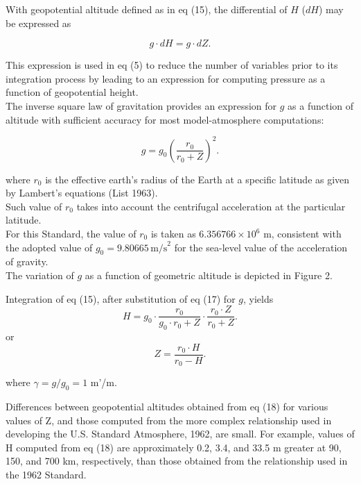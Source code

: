 \documentclass{article}
\begin{document}
With geopotential altitude defined as in eq (15), the differential of $H$ ($dH$) may be expressed as

\begin{equation}
 g\cdot dH = g\cdot dZ. \tag{16}
\end{equation}

This expression is used in eq (5) to reduce the number of variables prior to its integration process by leading to an expression for computing pressure as a function of geopotential height. \\

The inverse square law of gravitation provides an expression for $g$ as a function of altitude with sufficient accuracy for most model-atmosphere computations:

\begin{equation}
 g = g_0 \left( \frac{r_0}{r_0 + Z} \right)^2. \tag{17}
\end{equation}

where $r_0$ is the effective earth's radius of the Earth at a specific latitude as given by Lambert's equations (List 1963). \\
Such value of $r_0$ takes into account the centrifugal acceleration at the particular latitude. \\
For this Standard, the value of $r_0$ is taken as $6.356766 \times 10^6$ m, consistent with the adopted value of $g_0 = 9.80665 \, \text{m/s}^2$ for the sea-level value of the acceleration of gravity. \\
The variation of $g$ as a function of geometric altitude is depicted in Figure 2.


Integration of eq (15), after substitution of eq (17) for $g$, yields
\begin{equation}
 H = g_0 \cdot \frac{r_0}{g_0 \cdot r_0 + Z} \cdot \frac{r_0 \cdot Z}{r_0 + Z}. \tag{18}
\end{equation}
or
\begin{equation}
 Z = \frac{r_0 \cdot H}{r_0 - H}. \tag{19}
\end{equation}

where $\gamma = g/g_0 = 1$ m'/m.

Differences between geopotential altitudes obtained from eq (18) for various values of Z, and those computed from the more complex relationship used in developing the U.S. Standard Atmosphere, 1962, are small. For example, values of H computed from eq (18) are approximately 0.2, 3.4, and 33.5 m greater at 90, 150, and 700 km, respectively, than those obtained from the relationship used in the 1962 Standard.
\end{document}
